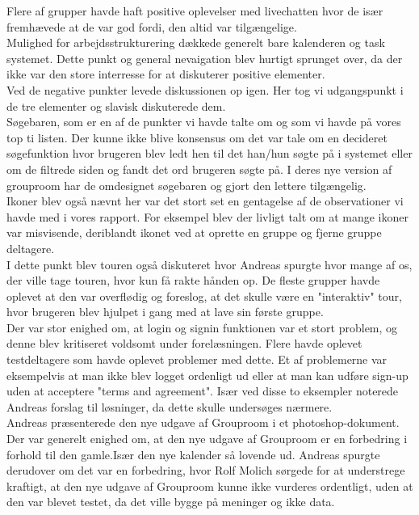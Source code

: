 \documentclass[12pt]{article}
\begin{document}
Flere af grupper havde haft positive oplevelser med livechatten hvor de især fremhævede at de var god fordi, den altid var tilgængelige. \\ Mulighed for arbejdsstrukturering dækkede generelt bare kalenderen og task systemet. Dette punkt og general nevaigation blev hurtigt sprunget over, da der ikke var den store interresse for at diskuterer positive elementer.\\

Ved de negative punkter levede diskussionen op igen. Her tog vi udgangspunkt i de tre elementer og slavisk diskuterede dem. \\
Søgebaren, som er en af de punkter vi havde talte om og som vi havde på vores top ti listen. Der kunne ikke blive konsensus om det var tale om en decideret søgefunktion hvor brugeren blev ledt hen til det han/hun søgte på i systemet eller om de filtrede siden og fandt det ord brugeren søgte på. I deres nye version af grouproom har de omdesignet søgebaren og gjort den lettere tilgængelig. \\

Ikoner blev også nævnt her var det stort set en gentagelse af de observationer vi havde med i vores rapport. For eksempel blev der livligt talt om at mange ikoner var misvisende, deriblandt ikonet ved at oprette en gruppe og fjerne gruppe deltagere.\\ I dette punkt blev touren også diskuteret hvor Andreas spurgte hvor mange af os, der ville tage touren, hvor kun få rakte hånden op. De fleste grupper havde oplevet at den var overflødig og foreslog, at det skulle være en "interaktiv" tour, hvor brugeren blev hjulpet i gang med at lave sin første gruppe.\\

Der var stor enighed om, at login og signin funktionen var et stort problem, og denne blev kritiseret voldsomt under forelæsningen. Flere havde oplevet testdeltagere som havde oplevet problemer med dette. Et af problemerne var eksempelvis at man ikke blev logget ordenligt ud eller at man kan udføre sign-up uden at acceptere "terms and agreement". Især ved disse to eksempler noterede Andreas forslag til løsninger, da dette skulle undersøges nærmere.\\

Andreas præsenterede den nye udgave af Grouproom i et photoshop-dokument. Der var generelt enighed om, at den nye udgave af Grouproom er en forbedring i forhold til den gamle.Især den nye kalender så lovende ud. Andreas spurgte derudover om det var en forbedring, hvor Rolf Molich sørgede for at understrege kraftigt, at den nye udgave af Grouproom kunne ikke vurderes ordentligt, uden at den var blevet testet, da det ville bygge på meninger og ikke data.
\end{document}
